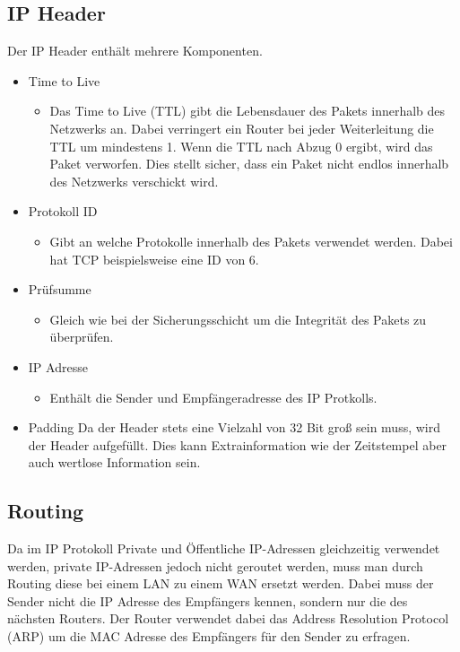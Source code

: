 \documentclass{article}
\begin{document}
	 \subsection{IP Header}
	 Der IP Header enthält mehrere Komponenten.
	 \begin{itemize}
	 	\item{Time to Live}
	 	\begin{itemize}
	 		\item{Das Time to Live (TTL) gibt die Lebensdauer des Pakets innerhalb des Netzwerks an. Dabei verringert ein Router bei jeder Weiterleitung die TTL um mindestens 1. Wenn die TTL nach Abzug 0 ergibt, wird das Paket verworfen. Dies stellt sicher, dass ein Paket nicht endlos innerhalb des Netzwerks verschickt wird. }
	 	\end{itemize}
	 	\item{Protokoll ID}
	 	\begin{itemize}
	 		\item{Gibt an welche Protokolle innerhalb des Pakets verwendet werden. Dabei hat TCP beispielsweise eine ID von 6.}
	 	\end{itemize}
	 	\item{Prüfsumme}
	 	\begin{itemize}
	 		\item{Gleich wie bei der Sicherungsschicht um die Integrität des Pakets zu überprüfen.}
	 	\end{itemize}
	 	\item{IP Adresse}
	 	\begin{itemize}
	 		\item{Enthält die Sender und Empfängeradresse des IP Protkolls.}
	 	\end{itemize}
	 	\item{Padding}
	 	Da der Header stets eine Vielzahl von 32 Bit groß sein muss, wird der Header aufgefüllt. Dies kann Extrainformation wie der Zeitstempel aber auch wertlose Information sein.
	 \end{itemize}
	 \subsection{Routing}
	 Da im IP Protokoll Private und Öffentliche IP-Adressen gleichzeitig verwendet werden, private IP-Adressen jedoch nicht geroutet werden, muss man durch Routing diese bei einem LAN zu einem WAN ersetzt werden. Dabei muss der Sender nicht die IP Adresse des Empfängers kennen, sondern nur die des nächsten Routers. Der Router verwendet dabei das Address Resolution Protocol (ARP) um die MAC Adresse des Empfängers für den Sender zu erfragen. \\
\end{document}
